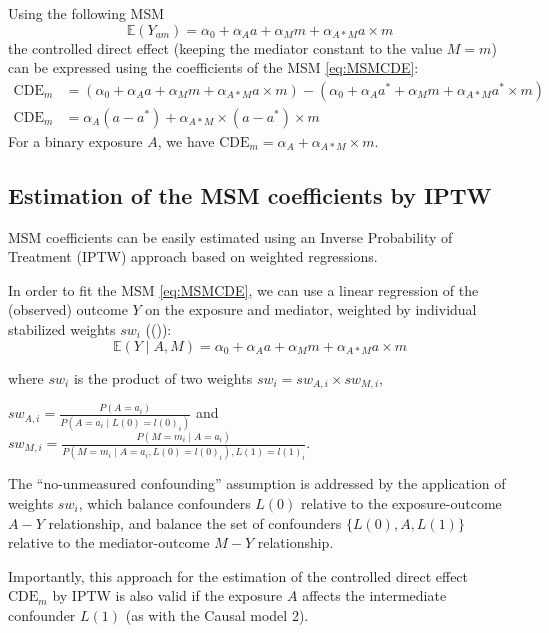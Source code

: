 \documentclass[
]{book}
\begin{document}
Using the following MSM
\begin{equation} 
  \mathbb{E}(Y_{am}) = \alpha_0 + \alpha_A a + \alpha_M m + \alpha_{A \ast M} a \times m
  \label{eq:MSMCDE}
\end{equation}
the controlled direct effect (keeping the mediator constant to the value \(M=m\)) can be expressed using the coefficients of the MSM \eqref{eq:MSMCDE}:
\begin{align*} 
  \text{CDE}_m &= (\alpha_0 + \alpha_A a + \alpha_M m + \alpha_{A \ast M} a \times m) - (\alpha_0 + \alpha_A a^* + \alpha_M m + \alpha_{A \ast M} a^* \times m) \\
  \text{CDE}_m &= \alpha_A(a - a^* ) + \alpha_{A \ast M} \times (a - a^*) \times m
\end{align*}
For a binary exposure \(A\), we have \(\text{CDE}_m=\alpha_A + \alpha_{A \ast M} \times m\).

\subsection{Estimation of the MSM coefficients by IPTW}\label{estimation-of-the-msm-coefficients-by-iptw-1}

MSM coefficients can be easily estimated using an Inverse Probability of Treatment (IPTW) approach based on weighted regressions.

In order to fit the MSM \eqref{eq:MSMCDE}, we can use a linear regression of the (observed) outcome \(Y\) on the exposure and mediator, weighted by individual stabilized weights \(sw_i\) (()):
\begin{equation} 
  \mathbb{E}\left(Y \mid A,M\right) = \alpha_0 + \alpha_A a + \alpha_M m + \alpha_{A \ast M} a \times m
\end{equation}

where \(sw_i\) is the product of two weights \(sw_i = sw_{A,i} \times sw_{M,i}\),

\(sw_{A,i}=\frac{P(A=a_i)}{P(A=a_i \mid L(0)=l(0)_i)}\) and \(sw_{M,i}=\frac{P(M=m_i \mid A=a_i)}{P(M = m_i \mid A=a_i,L(0)=l(0)_i), L(1)=l(1)_i}\).

The ``no-unmeasured confounding'' assumption is addressed by the application of weights \(sw_i\), which balance confounders \(L(0)\) relative to the exposure-outcome \(A-Y\) relationship, and balance the set of confounders \(\{L(0),A,L(1)\}\) relative to the mediator-outcome \(M-Y\) relationship.

Importantly, this approach for the estimation of the controlled direct effect \(\text{CDE}_m\) by IPTW is also valid if the exposure \(A\) affects the intermediate confounder \(L(1)\) (as with the Causal model 2).
\end{document}

